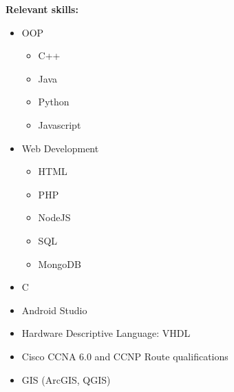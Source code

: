 \documentclass[12pt,a4paper]{article}
\begin{document}
		\parbox{\textwidth}{
			\textbf{\small Relevant skills:}\\
			\parbox{5cm}{
				\begin{itemize}\itemsep0em
					\item OOP
					\begin{itemize}\itemsep0em
						\item C++
						\item Java
						\item Python
						\item Javascript
					\end{itemize}
				\end{itemize}
			}
			\parbox{5cm}{
				\begin{itemize}\itemsep0em
					\item Web Development
					\begin{itemize}\itemsep0em
						\item HTML
						\item PHP
						\item NodeJS
						\item SQL
						\item MongoDB
					\end{itemize}
				\end{itemize}
			}
			\begin{itemize}\itemsep0em
				\item C
				\item Android Studio
				\item Hardware Descriptive Language: VHDL
				\item Cisco CCNA 6.0 and CCNP Route qualifications
				\item GIS (ArcGIS, QGIS)
			\end{itemize}
		}
\end{document}
